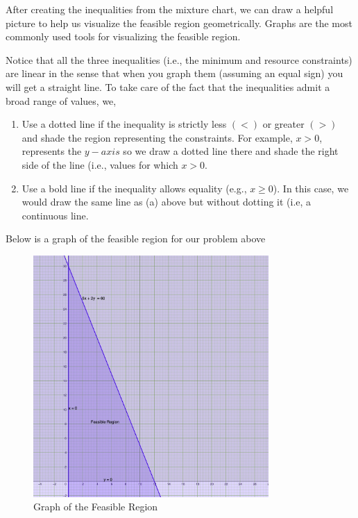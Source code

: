 \documentclass[
  letterpaper,
  DIV=11,
  numbers=noendperiod]{scrreprt}
\providecommand{\tightlist}{%
  \setlength{\itemsep}{0pt}\setlength{\parskip}{0pt}}\usepackage{longtable,booktabs,array}
\begin{document}
After creating the inequalities from the mixture chart, we can draw a
helpful picture to help us visualize the feasible region geometrically.
Graphs are the most commonly used tools for visualizing the feasible
region.

Notice that all the three inequalities (i.e., the minimum and resource
constraints) are linear in the sense that when you graph them (assuming
an equal sign) you will get a straight line. To take care of the fact
that the inequalities admit a broad range of values, we,

\begin{enumerate}
\def\labelenumi{\alph{enumi})}
\tightlist
\item
  Use a dotted line if the inequality is strictly less \((<)\) or
  greater \((>)\) and shade the region representing the constraints. For
  example, \(x>0\), represents the \(y-axis\) so we draw a dotted line
  there and shade the right side of the line (i.e., values for which
  \(x>0\).
\item
  Use a bold line if the inequality allows equality (e.g., \(x\ge0\)).
  In this case, we would draw the same line as (a) above but without
  dotting it (i.e, a continuous line.
\end{enumerate}

Below is a graph of the feasible region for our problem above

\begin{figure}

{\centering \includegraphics[width=0.8\textwidth,height=\textheight]{images/a.jpeg}

}

\caption{Graph of the Feasible Region}

\end{figure}
\end{document}
